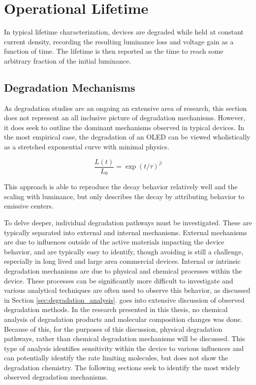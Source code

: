 \documentclass[../thesis.tex]{subfiles}
\begin{document}
\section{Operational Lifetime}
In typical lifetime characterization, devices are degraded while held at constant current density, recording the resulting luminance loss and voltage gain as a function of time.  
The lifetime is then reported as the time to reach some arbitrary fraction of the initial luminance.




\subsection{Degradation Mechanisms}\label{sec:degradation_mechanisms}

As degradation studies are an ongoing an extensive area of research, this section does not represent an all inclusive picture of degradation mechanisms.  However, it does seek to outline the dominant mechanisms observed in typical devices.
In the most empirical case, the degradation of an OLED can be viewed wholistically as a stretched exponential curve with minimal physics.\supercite{Scholz2015,Fry2005a}

\begin{equation}
\frac{L(t)}{L_0}=\exp (t/\tau)^\beta
\label{eqn:stretched_exponential}
\end{equation}

This approach is able to reproduce the decay behavior relatively well and the scaling with luminance, but only describes the decay by attributing behavior to emissive centers.

To delve deeper, individual degradation pathways must be investigated.
These are typically separated into external and internal mechanisms.\supercite{Scholz2015}
External mechanisms are due to influences outside of the active materials impacting the device behavior, and are typically easy to identify, though avoiding is still a challenge, especially in long lived and large area commercial devices.\supercite{Giebink2017a}
Internal or intrinsic degradation mechanisms are due to physical and chemical processes within the device.
These processes can be significantly more difficult to investigate and various analytical techniques are often used to observe this behavior, as discussed in Section \ref{sec:degradation_analysis}.
\textcite{Scholz2015} goes into extensive discussion of observed degradation methods.
In the research presented in this thesis, no chemical analysis of degradation products and molecular composition changes was done.
Because of this, for the purposes of this discussion, physical degradation pathways, rather than chemical degradation mechanisms will be discussed. 
This type of analysis identifies sensitivity within the device to various influences and can potentially identify the rate limiting molecules, but does not show the degradation chemistry.
The following sections seek to identify the most widely observed degradation mechanisms.
\end{document}
